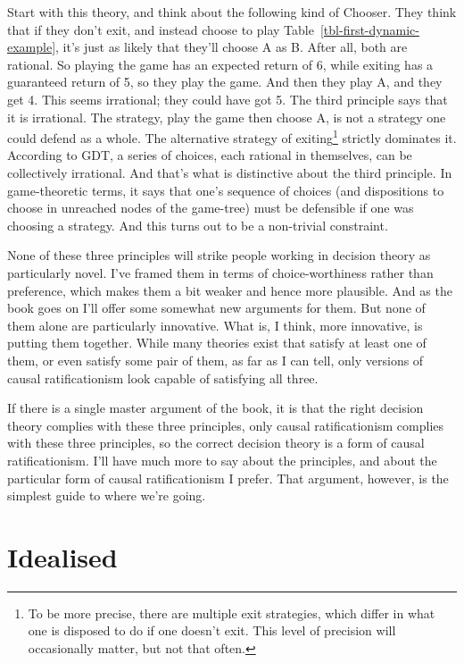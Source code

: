 \documentclass[
  12pt,
  letterpaper,
  DIV=11,
  numbers=noendperiod]{scrreprt}
\begin{document}
Start with this theory, and think about the following kind of Chooser.
They think that if they don't exit, and instead choose to play
Table~\ref{tbl-first-dynamic-example}, it's just as likely that they'll
choose A as B. After all, both are rational. So playing the game has an
expected return of 6, while exiting has a guaranteed return of 5, so
they play the game. And then they play A, and they get 4. This seems
irrational; they could have got 5. The third principle says that it is
irrational. The strategy, play the game then choose A, is not a strategy
one could defend as a whole. The alternative strategy of
exiting\footnote{To be more precise, there are multiple exit strategies,
  which differ in what one is disposed to do if one doesn't exit. This
  level of precision will occasionally matter, but not that often.}
strictly dominates it. According to GDT, a series of choices, each
rational in themselves, can be collectively irrational. And that's what
is distinctive about the third principle. In game-theoretic terms, it
says that one's sequence of choices (and dispositions to choose in
unreached nodes of the game-tree) must be defensible if one was choosing
a strategy. And this turns out to be a non-trivial constraint.

None of these three principles will strike people working in decision
theory as particularly novel. I've framed them in terms of
choice-worthiness rather than preference, which makes them a bit weaker
and hence more plausible. And as the book goes on I'll offer some
somewhat new arguments for them. But none of them alone are particularly
innovative. What is, I think, more innovative, is putting them together.
While many theories exist that satisfy at least one of them, or even
satisfy some pair of them, as far as I can tell, only versions of causal
ratificationism look capable of satisfying all three.

If there is a single master argument of the book, it is that the right
decision theory complies with these three principles, only causal
ratificationism complies with these three principles, so the correct
decision theory is a form of causal ratificationism. I'll have much more
to say about the principles, and about the particular form of causal
ratificationism I prefer. That argument, however, is the simplest guide
to where we're going.


\chapter{Idealised}\label{sec-ideal}
\end{document}
